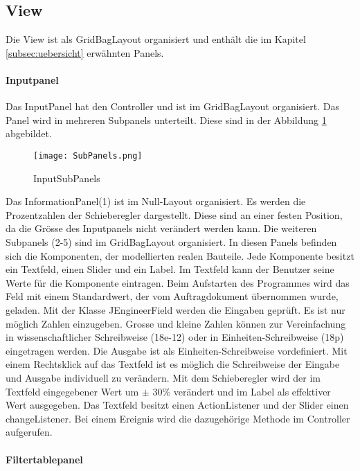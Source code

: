 \subsection{View} \label{subsec:view}
Die View ist als GridBagLayout organisiert und enthält die im Kapitel \ref{subsec:uebersicht} erwähnten Panels.
\bigskip

\paragraph{Inputpanel} \label{par:inputpanel}
Das InputPanel hat den Controller und ist im GridBagLayout organisiert. Das Panel wird in mehreren Subpanels unterteilt. Diese sind in der Abbildung  \ref{fig:subpanels} abgebildet. 

\begin{figure}[H]
	\centering
	\texttt{[image: SubPanels.png]}
	\caption{InputSubPanels}
	\label{fig:subpanels}
\end{figure} 

Das InformationPanel(1) ist im Null-Layout organisiert. Es werden die Prozentzahlen der Schieberegler dargestellt. Diese sind an einer festen Position, da die Grösse des Inputpanels nicht verändert werden kann. Die weiteren Subpanels (2-5) sind im GridBagLayout organisiert. In diesen Panels befinden sich die Komponenten, der modellierten realen Bauteile. Jede Komponente besitzt ein Textfeld, einen Slider und ein Label. Im Textfeld kann der Benutzer seine Werte für die Komponente eintragen. Beim Aufstarten des Programmes wird das Feld mit einem Standardwert, der vom Auftragdokument übernommen wurde, geladen. Mit der Klasse JEngineerField werden die Eingaben geprüft. Es ist nur möglich Zahlen einzugeben. Grosse und kleine Zahlen können zur Vereinfachung in wissenschaftlicher Schreibweise (18e-12) oder in Einheiten-Schreibweise (18p) eingetragen werden. Die Ausgabe ist als Einheiten-Schreibweise vordefiniert. Mit einem Rechtsklick auf das Textfeld ist es möglich die Schreibweise der Eingabe und Ausgabe individuell zu verändern.
Mit dem Schieberegler wird der im Textfeld eingegebener Wert um $\pm$ 30\% verändert und im Label als effektiver Wert ausgegeben. Das Textfeld besitzt einen ActionListener und der Slider einen changeListener. Bei einem Ereignis wird die dazugehörige Methode im Controller  aufgerufen.
\bigskip

\paragraph{Filtertablepanel} \label{par:filterpanel}


